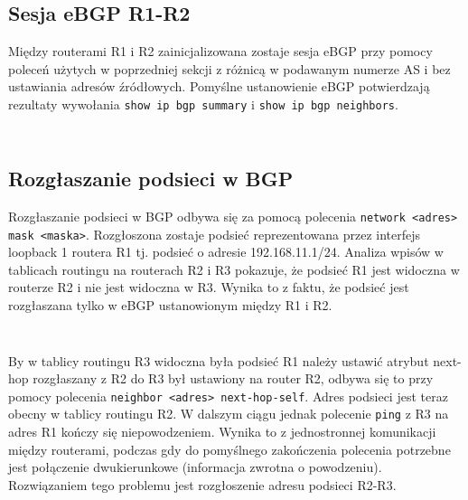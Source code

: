 \documentclass[a4paper,12pt,notitlepage]{article}
\begin{document}
\subsection{Sesja eBGP R1-R2}
Między routerami R1 i R2 zainicjalizowana zostaje sesja eBGP przy pomocy poleceń użytych w poprzedniej sekcji z różnicą w podawanym numerze AS i bez ustawiania adresów źródłowych. Pomyślne ustanowienie eBGP potwierdzają rezultaty wywołania \texttt{show ip bgp summary} i \texttt{show ip bgp neighbors}.
\inputminted[label=Rezultat polecenia show ip bgp summary na R1, firstline=123, lastline=128]{text}{Routers/R1.txt}
\inputminted[label=Rezultat polecenia show ip bgp summary na R2, firstline=321, lastline=327]{text}{Routers/R2.txt}
\subsection{Rozgłaszanie podsieci w BGP}
Rozgłaszanie podsieci w BGP odbywa się za pomocą polecenia  \texttt{network <adres> mask <maska>}. Rozgłoszona zostaje podsieć reprezentowana przez interfejs loopback 1 routera R1 tj. podsieć o adresie 192.168.11.1/24. Analiza wpisów w tablicach routingu na routerach R2 i R3 pokazuje, że podsieć R1 jest widoczna w routerze R2 i nie jest widoczna w R3. Wynika to z faktu, że podsieć jest rozgłaszana tylko w eBGP ustanowionym między R1 i R2.
\inputminted[label= Tablica routingu na R2, firstline=468, lastline=496]{text}{Routers/R2.txt}
\inputminted[label= Tablica routingu na R3, firstline=528, lastline=547]{text}{Routers/R3.txt}
By w tablicy routingu R3 widoczna była podsieć R1 należy ustawić atrybut next-hop rozgłaszany z R2 do R3 był ustawiony na router R2, odbywa się to przy pomocy polecenia \texttt{neighbor <adres> next-hop-self}. Adres podsieci jest teraz obecny w tablicy routingu R2. W dalszym ciągu jednak polecenie  \texttt{ping} z R3 na adres R1 kończy się niepowodzeniem. Wynika to z jednostronnej komunikacji między routerami, podczas gdy do pomyślnego zakończenia polecenia potrzebne jest połączenie dwukierunkowe (informacja zwrotna o powodzeniu). Rozwiązaniem tego problemu jest rozgłoszenie adresu podsieci R2-R3.
\inputminted[label= Pingowanie adresu R1 z routera R3, firstline=582, lastline=587]{text}{Routers/R3.txt}
\end{document}
